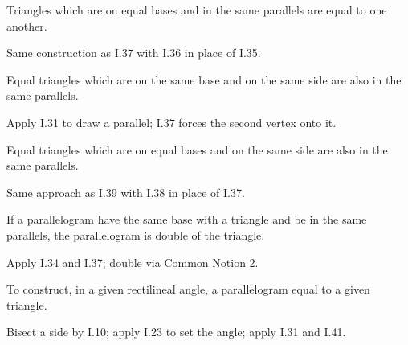 \begin{claim}
\label{prop:I.38}
Triangles which are on equal bases and in the same parallels are
equal to one another.
\end{claim}
\begin{evidence}[Proof of I.38]
\label{ev:I.38}
Same construction as I.37 with I.36 in place of I.35.
\end{evidence}

\begin{claim}
\label{prop:I.39}
Equal triangles which are on the same base and on the same side are
also in the same parallels.
\end{claim}
\begin{evidence}[Proof of I.39]
\label{ev:I.39}
Apply I.31 to draw a parallel; I.37 forces the second vertex onto it.
\end{evidence}

\begin{claim}
\label{prop:I.40}
Equal triangles which are on equal bases and on the same side are
also in the same parallels.
\end{claim}
\begin{evidence}[Proof of I.40]
\label{ev:I.40}
Same approach as I.39 with I.38 in place of I.37.
\end{evidence}

\begin{claim}
\label{prop:I.41}
If a parallelogram have the same base with a triangle and be in the
same parallels, the parallelogram is double of the triangle.
\end{claim}
\begin{evidence}[Proof of I.41]
\label{ev:I.41}
Apply I.34 and I.37; double via Common Notion 2.
\end{evidence}

\begin{claim}
\label{prop:I.42}
To construct, in a given rectilineal angle, a parallelogram equal to
a given triangle.
\end{claim}
\begin{evidence}[Proof of I.42]
\label{ev:I.42}
Bisect a side by I.10; apply I.23 to set the angle; apply I.31 and
I.41.
\end{evidence}

